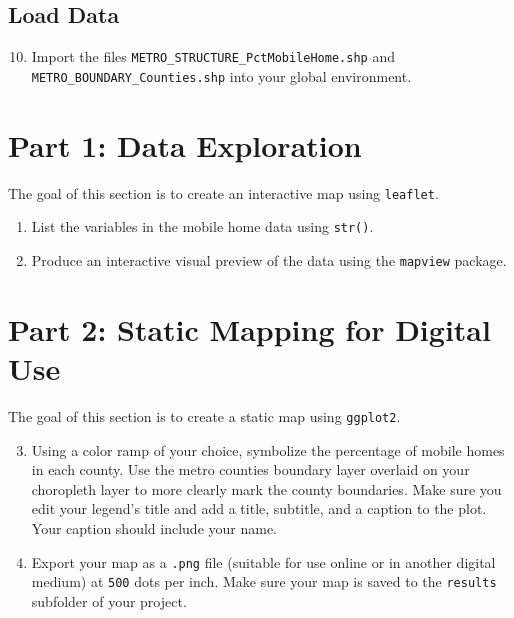 \documentclass{tufte-handout}
\begin{document}
\vspace{3mm}
\subsection{Load Data}
\begin{enumerate}[label=\alph*.]
\setcounter{enumi}{9}
\item Import the files \texttt{METRO\_STRUCTURE\_PctMobileHome.shp} and \\ \texttt{METRO\_BOUNDARY\_Counties.shp} into your global environment.
\end{enumerate}

\vspace{5mm}
\section{Part 1: Data Exploration}
The goal of this section is to create an interactive map using \texttt{leaflet}. 
\begin{enumerate}
\item List the variables in the mobile home data using \texttt{str()}.
\item Produce an interactive visual preview of the data using the \texttt{mapview} package.
\end{enumerate}

\vspace{5mm}
\section{Part 2: Static Mapping for Digital Use}
The goal of this section is to create a static map using \texttt{ggplot2}. 
\begin{enumerate}
\setcounter{enumi}{2}
\item Using a color ramp of your choice, symbolize the percentage of mobile homes in each county. Use the metro counties boundary layer overlaid on your choropleth layer to more clearly mark the county boundaries. Make sure you edit your legend's title and add a title, subtitle, and a caption to the plot. Your caption should include your name.
\item Export your map as a \texttt{.png} file (suitable for use online or in another digital medium) at \texttt{500} dots per inch. Make sure your map is saved to the \texttt{results} subfolder of your project.
\end{enumerate}

\vspace{5mm}
\end{document}
